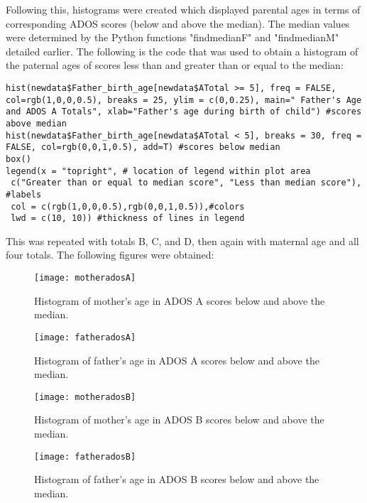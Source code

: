 \documentclass{article}
\begin{document}
Following this, histograms were created which displayed parental ages in terms of corresponding ADOS scores (below and above the median). The median values were determined by the Python functions "findmedianF" and "findmedianM" detailed earlier. The following is the code that was used to obtain a histogram of the paternal ages of scores less than and greater than or equal to the median:

\begin{verbatim}
hist(newdata$Father_birth_age[newdata$ATotal >= 5], freq = FALSE, col=rgb(1,0,0,0.5), breaks = 25, ylim = c(0,0.25), main=" Father's Age and ADOS A Totals", xlab="Father's age during birth of child") #scores above median
hist(newdata$Father_birth_age[newdata$ATotal < 5], breaks = 30, freq = FALSE, col=rgb(0,0,1,0.5), add=T) #scores below median
box()
legend(x = "topright", # location of legend within plot area
 c("Greater than or equal to median score", "Less than median score"), #labels
 col = c(rgb(1,0,0,0.5),rgb(0,0,1,0.5)),#colors
 lwd = c(10, 10)) #thickness of lines in legend
\end{verbatim}

This was repeated with totals B, C, and D, then again with maternal age and all four totals. The following figures were obtained: 

\begin{figure}[!htb]
  \centering
  \begin{minipage}[h!]{0.49\linewidth}
    \texttt{[image: motheradosA]}
    \caption{Histogram of mother's age in ADOS A scores below and above the median.}
  \end{minipage}
  \hfill
  \begin{minipage}[h!]{0.49\linewidth}
    \texttt{[image: fatheradosA]}
    \caption{Histogram of father's age in ADOS A scores below and above the median.}
  \end{minipage}
\end{figure}

\begin{figure}[!htb]
  \centering
  \begin{minipage}[h!]{0.49\linewidth}
    \texttt{[image: motheradosB]}
    \caption{Histogram of mother's age in ADOS B scores below and above the median.}
  \end{minipage}
  \hfill
  \begin{minipage}[h!]{0.49\linewidth}
    \texttt{[image: fatheradosB]}
    \caption{Histogram of father's age in ADOS B scores below and above the median.}
  \end{minipage}
\end{figure}
\end{document}
